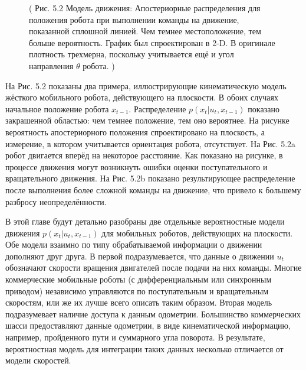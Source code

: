 \documentclass[10pt,a4paper]{article}
\begin{document}
\begin{figure}[H]
	\caption{ (  Рис. 5.2 Модель движения: Апостериорные распределения для положения робота при выполнении команды на движение, показанной сплошной линией. Чем темнее местоположение, тем больше вероятность. График был спроектирован в 2-D. В оригинале плотность трехмерна, поскольку учитывается ещё и угол направления $\theta$ робота. )}
	\label{fig:52orig}
\end{figure}

На Рис. 5.2 показаны два примера, иллюстрирующие кинематическую модель жёсткого мобильного робота, действующего на плоскости. В обоих случаях начальное положение робота $x_{t-1}$. Распределение $p(x_t | u_t, x_{t-1})$ показано закрашенной областью: чем темнее положение, тем оно вероятнее. На рисунке вероятность апостериорного положения спроектировано на плоскость, а измерение, в котором учитывается ориентация робота, отсутствует. На Рис. 5.2a робот двигается вперёд на некоторое расстояние. Как показано на рисунке, в процессе движения могут возникнуть ошибки оценки поступательного и вращательного движения. На Рис. 5.2b показано результирующее распределение после выполнения более сложной команды на движение, что привело к большему разбросу неопределённости. 

В этой главе будут детально разобраны две отдельные вероятностные модели движения $p(x_t | u_t, x_{t-1})$ для мобильных роботов, действующих на плоскости. Обе модели взаимно по типу обрабатываемой информации о движении дополняют друг друга. В первой подразумевается, что данные о движении $u_t$ обозначают скорости вращения двигателей после подачи на них команды. Многие коммерческие мобильные роботы (с дифференциальным или синхронным приводом) независимо управляются по поступательным и вращательным скоростям, или же их лучше всего описать таким образом. Вторая модель подразумевает наличие доступа к данным одометрии. Большинство коммерческих шасси предоставляют данные одометрии, в виде кинематической информацию, например, пройденного пути и суммарного угла поворота. В результате, вероятностная модель для интеграции таких данных несколько отличается от модели скоростей. 
\end{document}
